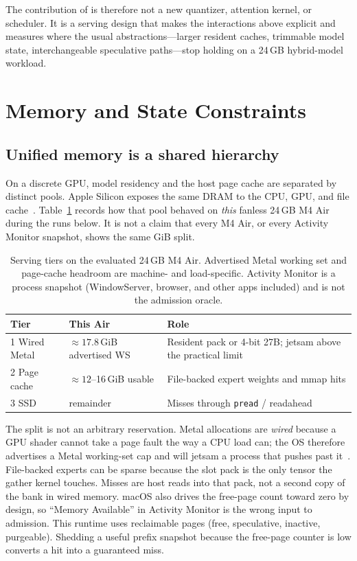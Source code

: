 The contribution of \slotbank{} is therefore not a new quantizer, attention kernel, or scheduler. It is a serving design that makes the interactions above explicit and measures where the usual abstractions---larger resident caches, trimmable model state, interchangeable speculative paths---stop holding on a 24\,GB hybrid-model workload.

\section{Memory and State Constraints}
\label{sec:bg}

\subsection{Unified memory is a shared hierarchy}
\label{sec:tiers}

On a discrete GPU, model residency and the host page cache are separated by distinct pools. Apple Silicon exposes the same DRAM to the CPU, GPU, and file cache~\citep{appleum,applemetalws}. Table~\ref{tab:tiers} records how that pool behaved on \emph{this} fanless 24\,GB M4 Air during the runs below. It is not a claim that every M4 Air, or every Activity Monitor snapshot, shows the same GiB split.

\begin{table}[t]
\centering
\caption{Serving tiers on the evaluated 24\,GB M4 Air. Advertised Metal working set and page-cache headroom are machine- and load-specific. Activity Monitor is a process snapshot (WindowServer, browser, and other apps included) and is not the admission oracle.}
\label{tab:tiers}
\small
\begin{tabular}{@{}lll@{}}
\toprule
Tier & This Air & Role \\
\midrule
1 Wired Metal & ${\approx}17.8$\,GiB advertised WS & Resident pack or 4-bit 27B; jetsam above the practical limit \\
2 Page cache & ${\approx}12$--16\,GiB usable & File-backed expert weights and mmap hits \\
3 SSD & remainder & Misses through \texttt{pread} / readahead \\
\bottomrule
\end{tabular}
\end{table}

The split is not an arbitrary reservation. Metal allocations are \emph{wired} because a GPU shader cannot take a page fault the way a CPU load can; the OS therefore advertises a Metal working-set cap and will jetsam a process that pushes past it~\citep{applejetsam,applemetalws}. File-backed experts can be sparse because the slot pack is the only tensor the gather kernel touches. Misses are host reads into that pack, not a second copy of the bank in wired memory. macOS also drives the free-page count toward zero by design, so ``Memory Available'' in Activity Monitor is the wrong input to admission. This runtime uses reclaimable pages (free, speculative, inactive, purgeable). Shedding a useful prefix snapshot because the free-page counter is low converts a hit into a guaranteed miss.

